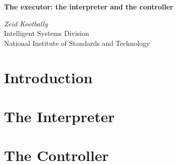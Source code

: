 \documentclass[12pt]{article}
\begin{document}
\begin{titlepage}
\begin{center}

\textbf{The executor: the interpreter and the controller}\\

\vspace{1.5cm} %

\textit{Zeid Kootbally}\\
Intelligent Systems Division\\
National Institute of Standards and Technology                                                                                                                                                                                                                                                                                                                                                                                                                                                                                                                                                                                                                                                                                                                                                                                                                                                                                                                                                                                                   
                                                                                                                                                             \\

\end{center}
\end{titlepage}
\cleardoublepage

\tableofcontents
\cleardoublepage

\section{Introduction}
\label{s:introduction}



\section{The Interpreter}
\label{s:interpreter}


 \section{The Controller}
 \label{s:controller}
 
\end{document}

